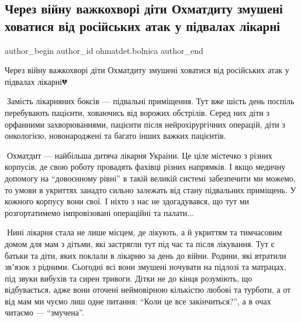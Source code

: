  
 
 
 
 

\subsection{Через війну важкохворі діти Охматдиту змушені ховатися від російських атак у підвалах лікарні}
\label{sec:01_03_2022.fb.ohmatdet.bolnica.1.dity_pidvaly_likarni}

\ifcmt
 author_begin
   author_id ohmatdet.bolnica
 author_end
\fi

Через війну важкохворі діти Охматдиту змушені ховатися від російських атак у
підвалах лікарні💔

🔻Замість лікарняних боксів — підвальні приміщення. Тут вже шість день поспіль
перебувають пацієнти, ховаючись від ворожих обстрілів. Серед них діти з
орфанними захворюваннями, пацієнти після нейрохірургічних операцій, діти з
онкологією, новонароджені та багато інших важких пацієнтів.

🔻Охматдит — найбільша дитяча лікарня України. Це ціле містечко з різних
корпусів, де свою роботу провадять фахівці різних напрямків. І якщо медичну
допомогу на \enquote{довоєнному рівні} в такій великій системі забезпечити ми можемо,
то умови в укриттях занадто сильно залежать від стану підвальних приміщень. У
кожного корпусу вони свої. І ніхто з нас не здогадувався, що тут ми
розгортатимемо імпровізовані операційні та палати...

🔻Нині лікарня стала не лише місцем, де лікують, а й укриттям та тимчасовим
домом для мам з дітьми, які застрягли тут під час та після лікування. Тут є
батьки та діти, яких поклали в лікарню за день до війни. Родини, які втратили
звʼязок з рідними. Сьогодні всі вони змушені ночувати на підлозі та матрацах,
під звуки вибухів та сирен тривоги. Дітки не до кінця розуміють, що
відбувається, адже вони оточені неймовірною кількістю любові та турботи, а от
від мам ми чуємо лиш одне питання: \enquote{Коли це все закінчиться?}, а в очах читаємо
—  \enquote{змучена}.

